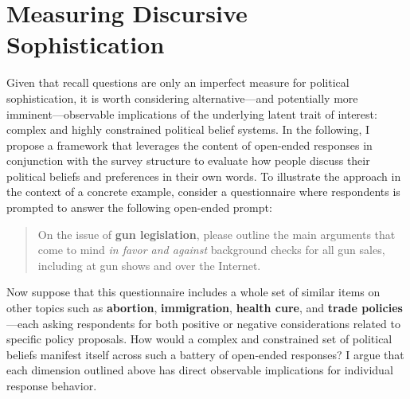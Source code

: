 

\section*{Measuring Discursive Sophistication}


Given that recall questions are only an imperfect measure for political sophistication, it is worth considering alternative---and potentially more imminent---observable implications of the underlying latent trait of interest: complex and highly constrained political belief systems. In the following, I propose a framework that leverages the content of open-ended responses in conjunction with the survey structure to evaluate how people discuss their political beliefs and preferences in their own words. To illustrate the approach in the context of a concrete example, consider a questionnaire where respondents is prompted to answer the following open-ended prompt:

\begin{quote}
	On the issue of \textbf{gun legislation}, please outline the main arguments that come to mind \textit{in favor and against} background checks for all gun sales, including at gun shows and over the Internet.
\end{quote}

Now suppose that this questionnaire includes a whole set of similar items on other topics such as \textbf{abortion}, \textbf{immigration}, \textbf{health cure}, and \textbf{trade policies}---each asking respondents for both positive or negative considerations related to specific policy proposals. How would a complex and constrained set of political beliefs manifest itself across such a battery of open-ended responses? I argue that each dimension outlined above has direct observable implications for individual response behavior.

